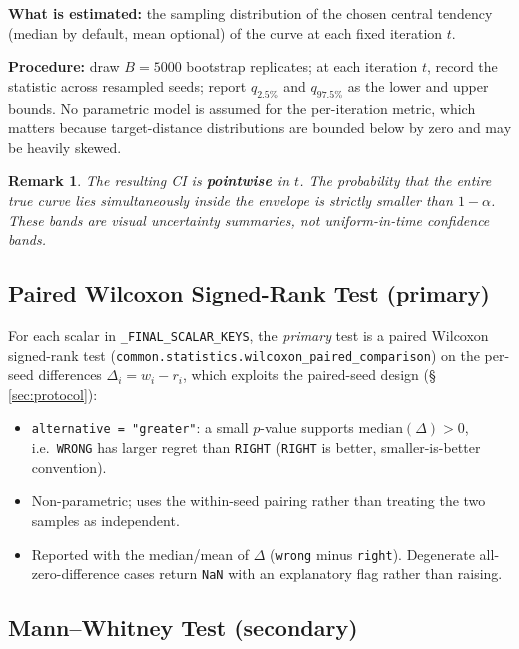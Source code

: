 \documentclass[11pt]{article}
\newtheorem{remark}{Remark}[section]
\newcommand{\RIGHT}{\texttt{RIGHT}}
\newcommand{\WRONG}{\texttt{WRONG}}
\begin{document}
\textbf{What is estimated:} the sampling distribution of the chosen central tendency
(median by default, mean optional) of the curve at each fixed iteration $t$.
 
\textbf{Procedure:} draw $B = 5000$ bootstrap replicates; at each iteration $t$,
record the statistic across resampled seeds; report $q_{2.5\%}$ and $q_{97.5\%}$
as the lower and upper bounds. No parametric model is assumed for the per-iteration metric, which matters because
target-distance distributions are bounded below by zero and may be heavily skewed.
 
\begin{remark}
The resulting CI is \textbf{pointwise} in $t$.
The probability that the entire true curve lies simultaneously inside the envelope
is strictly smaller than $1 - \alpha$.
These bands are visual uncertainty summaries, not uniform-in-time confidence bands.
\end{remark}
 
\subsection{Paired Wilcoxon Signed-Rank Test (primary)}

For each scalar in \texttt{\_FINAL\_SCALAR\_KEYS}, the \emph{primary} test is a
paired Wilcoxon signed-rank test
(\texttt{common.statistics.wilcoxon\_paired\_comparison}) on the per-seed
differences $\Delta_i = w_i - r_i$, which exploits the paired-seed design
(\S\,\ref{sec:protocol}):
\begin{itemize}
  \item \texttt{alternative = "greater"}: a small $p$-value supports
        $\mathrm{median}(\Delta) > 0$, i.e.\ \WRONG{} has larger regret than
        \RIGHT{} (\RIGHT{} is better, smaller-is-better convention).
  \item Non-parametric; uses the within-seed pairing rather than treating the
        two samples as independent.
  \item Reported with the median/mean of $\Delta$ (\texttt{wrong} minus
        \texttt{right}). Degenerate all-zero-difference cases return \texttt{NaN}
        with an explanatory flag rather than raising.
\end{itemize}

\subsection{Mann--Whitney Test (secondary)}
\end{document}
